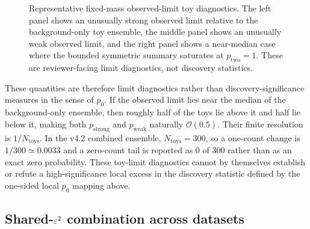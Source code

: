 \begin{figure}[H]
\centering
{}
\caption{Representative fixed-mass observed-limit toy diagnostics. The left panel
shows an unusually strong observed limit relative to the background-only toy
ensemble, the middle panel shows an unusually weak observed limit, and the right
panel shows a near-median case where the bounded symmetric summary saturates at
$p_{\mathrm{two}}=1$. These are reviewer-facing limit diagnostics, not discovery
statistics.}
\label{fig:pvalue-tail-examples}
\end{figure}

These quantities are therefore limit diagnostics rather than discovery-significance
measures in the sense of $p_0$. If the observed limit lies near the median of the
background-only ensemble, then roughly half of the toys lie above it and half lie
below it, making both $p_{\mathrm{strong}}$ and $p_{\mathrm{weak}}$ naturally
$\mathcal{O}(0.5)$. Their finite resolution is $1/N_{\mathrm{toys}}$. In the v4.2
combined ensemble, $N_{\mathrm{toys}}=300$, so a one-count change is
$1/300\simeq0.0033$ and a zero-count tail is reported as 0 of 300 rather than as an
exact zero probability. These toy-limit diagnostics cannot by themselves establish
or refute a high-significance local excess in the discovery statistic defined by the
one-sided local $p_0$ mapping above.

\subsection{Shared-\texorpdfstring{$\varepsilon^2$}{epsilon2} combination across datasets}
\label{sec:combination}

